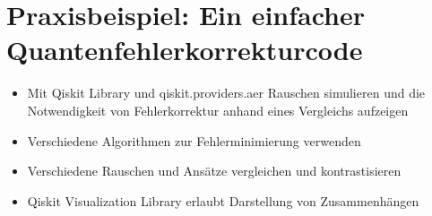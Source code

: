 \section{Praxisbeispiel: Ein einfacher Quantenfehlerkorrekturcode}
\begin{itemize}
    \item Mit Qiskit Library und qiskit.providers.aer Rauschen simulieren und die Notwendigkeit von Fehlerkorrektur anhand eines Vergleichs aufzeigen
    \item Verschiedene Algorithmen zur Fehlerminimierung verwenden
    \item Verschiedene Rauschen und Ansätze vergleichen und kontrastisieren
    \item Qiskit Visualization Library erlaubt Darstellung von Zusammenhängen
\end{itemize}



\printbibliography
